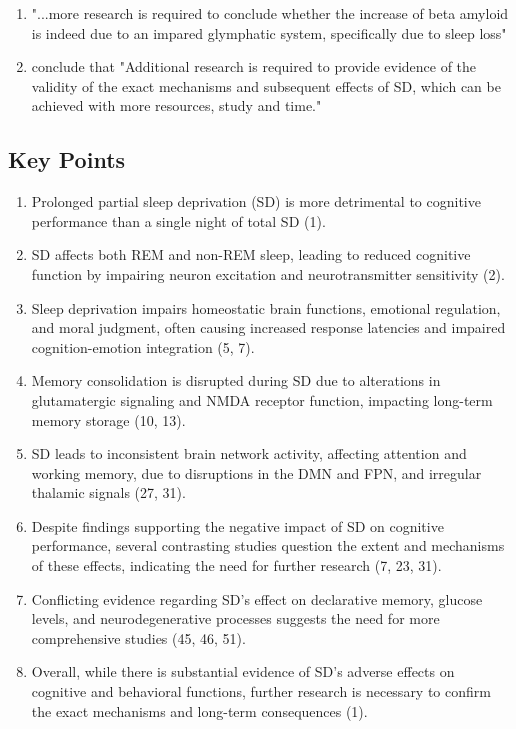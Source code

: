 \begin{enumerate}
	\item "...more research is required to conclude whether the increase of beta amyloid is indeed due to an impared glymphatic system, specifically due to sleep loss" 

	\item \citeauthor{1} conclude that "Additional research is required to provide evidence of the validity of the exact mechanisms and subsequent effects of SD, which can be achieved with more resources, study and time."

\end{enumerate}

\begin{centering}\subsection{Key Points}\end{centering}

\begin{enumerate}

    \item Prolonged partial sleep deprivation (SD) is more detrimental to cognitive performance than a single night of total SD (1).

    \item SD affects both REM and non-REM sleep, leading to reduced cognitive function by impairing neuron excitation and neurotransmitter sensitivity (2).

    \item Sleep deprivation impairs homeostatic brain functions, emotional regulation, and moral judgment, often causing increased response latencies and impaired cognition-emotion integration (5, 7).

    \item Memory consolidation is disrupted during SD due to alterations in glutamatergic signaling and NMDA receptor function, impacting long-term memory storage (10, 13).

    \item SD leads to inconsistent brain network activity, affecting attention and working memory, due to disruptions in the DMN and FPN, and irregular thalamic signals (27, 31).

    \item Despite findings supporting the negative impact of SD on cognitive performance, several contrasting studies question the extent and mechanisms of these effects, indicating the need for further research (7, 23, 31).

    \item Conflicting evidence regarding SD's effect on declarative memory, glucose levels, and neurodegenerative processes suggests the need for more comprehensive studies (45, 46, 51).

    \item Overall, while there is substantial evidence of SD's adverse effects on cognitive and behavioral functions, further research is necessary to confirm the exact mechanisms and long-term consequences (1).
    
\end{enumerate}
